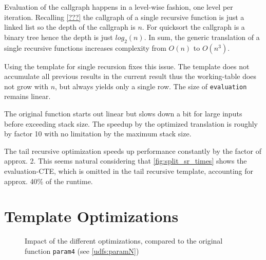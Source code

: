 Evaluation of the callgraph happens in a level-wise fashion, one level per iteration. Recalling \autoref{???} the callgraph of a single recursive function is just a linked list so the depth of the callgraph is $n$. For quicksort the callgraph is a binary tree hence the depth is just $log_2(n)$. In sum, the generic translation of a single recursive functions increases complexity from $O(n)$ to $O(n^3)$.

Using the template for single recursion fixes this issue. The template does not accumulate all previous results in the current result thus the working-table does not grow with $n$, but always yields only a single row. The size of \texttt{evaluation} remains linear.

The original function starts out linear but slows down a bit for large inputs before exceeding stack size. The speedup by the optimized translation is roughly by factor 10 with no limitation by the maximum stack size.

The tail recursive optimization speeds up performance constantly by the factor of approx. 2. This seems natural considering that \autoref{fig:split_sr_times} shows the evaluation-CTE, which is omitted in the tail recursive template, accounting for approx. 40\% of the runtime.

\section{Template Optimizations}


\begin{figure}[h!]
    \centering\small
    
    \caption{Impact of the different optimizations, compared to the original function \texttt{param4} (see \autoref{udfs:paramN})}
    \label{fig:paramN}
\end{figure}



